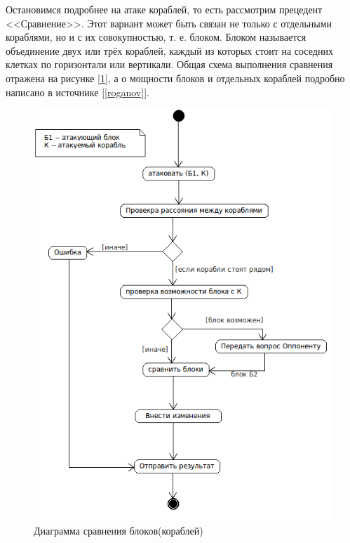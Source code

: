 Остановимся подробнее на атаке кораблей, то есть рассмотрим прецедент <<Сравнение>>. Этот вариант может быть связан не только с отдельными кораблями, но и с их совокупностью, т. е. блоком.
 Блоком называется объединение двух или трёх кораблей, каждый из которых стоит на соседних клетках по горизонтали или вертикали. Общая схема выполнения сравнения отражена на рисунке [\ref{fig18}], а о мощности блоков и отдельных кораблей подробно написано в источнике [\ref{roganov}].
\begin{figure}[htp]
\centering
\includegraphics[width=12cm]{images/ask.png}
\caption{Диаграмма сравнения блоков(кораблей)}
\label{fig18}
\end{figure}
\endinput
